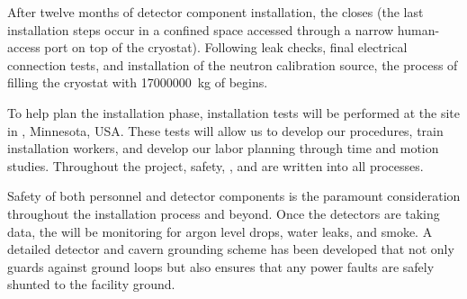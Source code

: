 After twelve months of detector component installation, the  closes (the last installation steps occur in a confined space accessed through a narrow human-access port on top of the cryostat). 
Following leak checks, final electrical connection tests, and installation of the neutron calibration source, the process of filling the cryostat with \SI{17000000}{\kilo\gram} of  begins.

To help plan the installation phase, installation tests will be performed at the   site in , Minnesota, USA. These tests will allow us to develop our procedures, train installation workers, and develop our labor planning through time and motion studies. Throughout the project, safety, , and  are written into all processes.

Safety of both personnel and  detector components is the paramount consideration throughout the installation process and beyond. Once the detectors are taking data, %
the  will be monitoring for argon level drops, water leaks, and smoke. A detailed detector and cavern grounding scheme has been developed that not only guards against ground loops but also ensures that any power faults are safely shunted to the facility ground.


